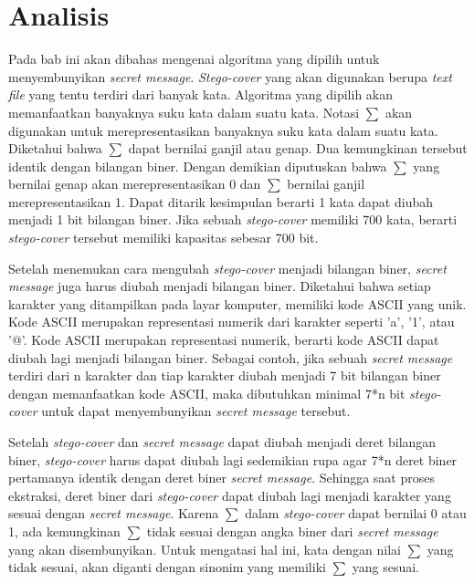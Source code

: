 \chapter{Analisis}
Pada bab ini akan dibahas mengenai algoritma yang dipilih untuk menyembunyikan \textit{secret message}. \textit{Stego-cover} yang akan digunakan berupa \textit{text file} yang tentu terdiri dari banyak kata. Algoritma yang dipilih akan memanfaatkan banyaknya suku kata dalam suatu kata. Notasi $\sum$ akan digunakan untuk merepresentasikan banyaknya suku kata dalam suatu kata. Diketahui bahwa $\sum$ dapat bernilai ganjil atau genap. Dua kemungkinan tersebut identik dengan bilangan biner. Dengan demikian diputuskan bahwa $\sum$ yang bernilai genap akan merepresentasikan 0 dan $\sum$ bernilai ganjil merepresentasikan 1. Dapat ditarik kesimpulan berarti 1 kata dapat diubah menjadi 1 bit bilangan biner. Jika sebuah \textit{stego-cover} memiliki 700 kata, berarti \textit{stego-cover} tersebut memiliki kapasitas sebesar 700 bit.

Setelah menemukan cara mengubah \textit{stego-cover} menjadi bilangan biner, \textit{secret message} juga harus diubah menjadi bilangan biner. Diketahui bahwa setiap karakter yang ditampilkan pada layar komputer, memiliki kode ASCII yang unik. Kode ASCII merupakan representasi numerik dari karakter seperti 'a', '1', atau '@'. Kode ASCII merupakan representasi numerik, berarti kode ASCII dapat diubah lagi menjadi bilangan biner. Sebagai contoh, jika sebuah \textit{secret message} terdiri dari n karakter dan tiap karakter diubah menjadi 7 bit bilangan biner dengan memanfaatkan kode ASCII, maka dibutuhkan minimal 7*n bit \textit{stego-cover} untuk dapat menyembunyikan \textit{secret message} tersebut. 

Setelah \textit{stego-cover} dan \textit{secret message} dapat diubah menjadi deret bilangan biner, \textit{stego-cover} harus dapat diubah lagi sedemikian rupa agar 7*n deret biner pertamanya identik dengan deret biner \textit{secret message}. Sehingga saat proses ekstraksi, deret biner dari \textit{stego-cover} dapat diubah lagi menjadi karakter yang sesuai dengan \textit{secret message}. Karena $\sum$ dalam \textit{stego-cover} dapat bernilai 0 atau 1, ada kemungkinan $\sum$ tidak sesuai dengan angka biner dari \textit{secret message} yang akan disembunyikan. Untuk mengatasi hal ini, kata dengan nilai $\sum$ yang tidak sesuai, akan diganti dengan sinonim yang memiliki $\sum$ yang sesuai.

